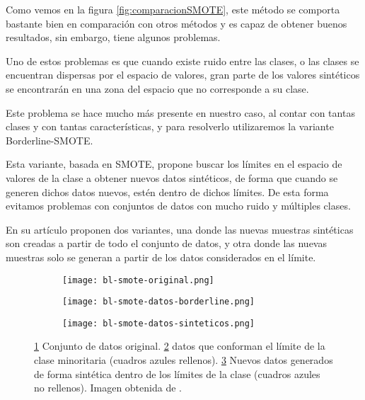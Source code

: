 Como vemos en la figura \ref{fig:comparacionSMOTE}, este método se comporta bastante bien en comparación con otros métodos y es capaz de obtener buenos resultados, sin embargo, tiene algunos problemas.

Uno de estos problemas es que cuando existe ruido entre las clases, o las clases se encuentran dispersas por el espacio de valores, gran parte de los valores sintéticos se encontrarán en una zona del espacio que no corresponde a su clase.

Este problema se hace mucho más presente en nuestro caso, al contar con tantas clases y con tantas características, y para resolverlo utilizaremos la variante Borderline-SMOTE.

Esta variante, basada en SMOTE, propone buscar los límites en el espacio de valores de la clase a obtener nuevos datos sintéticos, de forma que cuando se generen dichos datos nuevos, estén dentro de dichos límites. De esta forma evitamos problemas con conjuntos de datos con mucho ruido y múltiples clases.

En su artículo proponen dos variantes, una donde las nuevas muestras sintéticas son creadas a partir de todo el conjunto de datos, y otra donde las nuevas muestras solo se generan a partir de los datos considerados en el límite.


\begin{figure}[H]
    \centering
    \begin{subfigure}[b]{0.33\textwidth}
		  \texttt{[image: bl-smote-original.png]}
        \caption{}
        \label{fig:blSMOTE-orig}
    \end{subfigure}
    \begin{subfigure}[b]{0.33\textwidth}
        \texttt{[image: bl-smote-datos-borderline.png]}
        \caption{}
        \label{fig:blSMOTE-border}
    \end{subfigure}
    \begin{subfigure}[b]{0.33\textwidth}
        \texttt{[image: bl-smote-datos-sinteticos.png]}
        \caption{}
        \label{fig:blSMOTE-sintetico}
    \end{subfigure}

    \caption{\ref{fig:blSMOTE-orig} Conjunto de datos original. \ref{fig:blSMOTE-border} datos que conforman el límite de la clase minoritaria (cuadros azules rellenos). \ref{fig:blSMOTE-sintetico} Nuevos datos generados de forma sintética dentro de los límites de la clase (cuadros azules no rellenos). Imagen obtenida de \cite{BL-SMOTE}.}
	 \label{fig:ejemploBL-SMOTE}

\end{figure}


